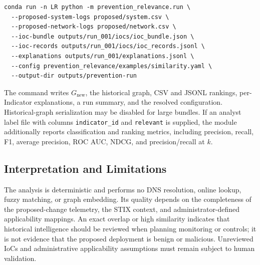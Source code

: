 \begin{verbatim}
conda run -n LR python -m prevention_relevance.run \
  --proposed-system-logs proposed/system.csv \
  --proposed-network-logs proposed/network.csv \
  --ioc-bundle outputs/run_001/iocs/ioc_bundle.json \
  --ioc-records outputs/run_001/iocs/ioc_records.jsonl \
  --explanations outputs/run_001/explanations.jsonl \
  --config prevention_relevance/examples/similarity.yaml \
  --output-dir outputs/prevention-run
\end{verbatim}

The command writes $G_{\mathrm{new}}$, the historical graph, CSV and JSONL
rankings, per-Indicator explanations, a run summary, and the resolved
configuration. Historical-graph serialization may be disabled for large
bundles. If an analyst label file with columns \texttt{indicator\_id} and
\texttt{relevant} is supplied, the module additionally reports classification
and ranking metrics, including precision, recall, F1, average precision, ROC
AUC, NDCG, and precision/recall at $k$.

\subsection{Interpretation and Limitations}

The analysis is deterministic and performs no DNS resolution, online lookup,
fuzzy matching, or graph embedding. Its quality depends on the completeness of
the proposed-change telemetry, the STIX context, and administrator-defined
applicability mappings. An exact overlap or high similarity indicates that
historical intelligence should be reviewed when planning monitoring or
controls; it is not evidence that the proposed deployment is benign or
malicious. Unreviewed IoCs and administrative applicability assumptions must
remain subject to human validation.

